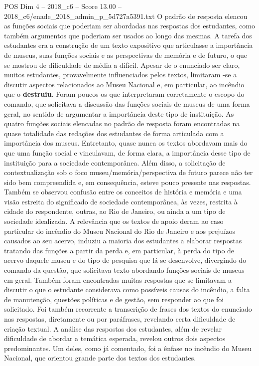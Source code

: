 \begin{textsample}{POS Dim 4 – 2018\_c6 – Score 13.00 – 2018\_c6/enade\_2018\_admin\_p\_5d727a5391.txt}
O padrão de resposta elencou as funções sociais que poderiam ser abordadas nas respostas dos estudantes, como também argumentos que poderiam ser usados ao longo das mesmas.
A tarefa dos estudantes era a construção de um texto expositivo que articulasse a importância de museus, suas funções sociais e as perspectivas de memória e de futuro, o que se mostrou de dificuldade de média a difícil.
Apesar de o enunciado ser claro, muitos estudantes, provavelmente influenciados pelos textos, limitaram -se a discutir aspectos relacionados ao Museu Nacional e, em particular, ao incêndio que o \textbf{destruiu}.
Foram poucos os que interpretaram corretamente o escopo do comando, que solicitava a discussão das funções sociais de museus de uma forma geral, no sentido de argumentar a importância deste tipo de instituição.
As quatro funções sociais elencadas no padrão de resposta foram encontradas na quase totalidade das redações dos estudantes de forma articulada com a importância dos museus.
Entretanto, quase nunca os textos abordavam mais do que uma função social e vinculavam, de forma clara, a importância desse tipo de instituição para a sociedade contemporânea.
Além disso, a solicitação de contextualização sob o foco museu/memória/perspectiva de futuro parece não ter sido bem compreendida e, em consequência, esteve pouco presente nas respostas.
Também se observou confusão entre os conceitos de história e memória e uma visão estreita do significado de sociedade contemporânea, às vezes, restrita à cidade do respondente, outras, ao Rio de Janeiro, ou ainda a um tipo de sociedade idealizada.
A relevância que os textos de apoio deram ao caso particular do incêndio do Museu Nacional do Rio de Janeiro e aos prejuízos causados ao seu acervo, induziu a maioria dos estudantes a elaborar respostas tratando das funções a partir da perda e, em particular, à perda do tipo de acervo daquele museu e do tipo de pesquisa que lá se desenvolve, divergindo do comando da questão, que solicitava texto abordando funções sociais de museus em geral.
Também foram encontradas muitas respostas que se limitavam a discutir o que o estudante considerava como possíveis causas do incêndio, a falta de manutenção, questões políticas e de gestão, sem responder ao que foi solicitado.
Foi também recorrente a transcrição de frases dos textos do enunciado nas respostas, diretamente ou por paráfrases, revelando certa dificuldade de criação textual.
A análise das respostas dos estudantes, além de revelar dificuldade de abordar a temática esperada, revelou outros dois aspectos predominantes.
Um deles, como já comentado, foi a ênfase no incêndio do Museu Nacional, que orientou grande parte dos textos dos estudantes.

\end{textsample}
